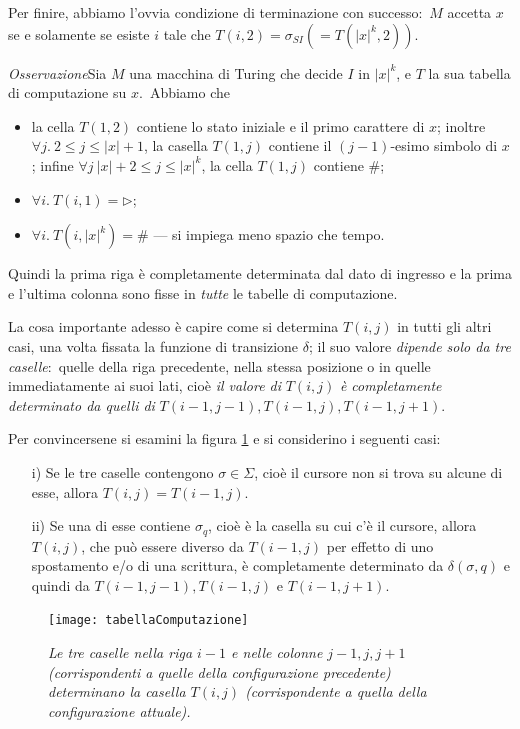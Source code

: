 \noindent Per finire, abbiamo l'ovvia condizione di terminazione con successo:\ $M$ accetta $x$ se e solamente se esiste $i$ tale che $T(i, 2) = \sigma_{SI} (= T(|x|^k, 2))$.\

\medskip
\noindent\textit{Osservazione}\quad Sia $M$ una macchina di Turing che decide $I$ in $|x|^k$, e $T$ la sua tabella di computazione su $x$.\
Abbiamo che

\begin{itemize}
    \item la cella $T(1,2)$ contiene lo stato iniziale e il primo carattere di $x$; inoltre $\forall j.\ 2 \leq j \leq |x|+1$, la casella $T(1,j)$ contiene il $(j-1)$-esimo simbolo di $x$; infine $\forall j\ |x| + 2 \leq j \leq |x|^k$, la cella $T(1,j)$ contiene \#;
    \item $\forall i.\ T(i,1) = \triangleright$;
    \item $\forall i.\ T\left(i,|x|^k\right) = \#$ --- si impiega meno spazio che tempo.
\end{itemize}

\noindent Quindi la prima riga è completamente determinata dal dato di ingresso e la prima e l'ultima colonna sono fisse in \textit{tutte} le tabelle di computazione.\

La cosa importante adesso è capire come si determina $T(i,j)$ in tutti gli altri casi, una volta fissata la funzione di transizione $\delta$; il suo valore \textit{dipende solo da tre caselle}:\ quelle della riga precedente, nella stessa posizione o in quelle immediatamente ai suoi lati, cioè \textit{il valore di} $T(i,j)$ \textit{è completamente determinato da quelli di} $T(i-1,j-1), T(i-1,j), T(i-1, j+1)$.\

\medskip
\noindent Per convincersene si esamini la figura \ref{fig:tabella} e si considerino i seguenti casi:

\begin{itemize}
    \item[i)] Se le tre caselle contengono $\sigma \in \Sigma$, cioè il cursore non si trova su alcune di esse, allora $T(i,j)= T(i-1,j)$.
    \item[ii)] Se una di esse contiene $\sigma_q$, cioè è la casella su cui c'è il cursore, allora $T(i,j)$, che può essere diverso da $T(i-1,j)$ per effetto di uno spostamento e/o di una scrittura, è completamente determinato da $\delta(\sigma, q)$ e quindi da $T(i-1,j-1), T(i-1,j)$ e $T(i-1,j+1)$.\
\end{itemize}

\begin{figure}[H]
    \centering
    \texttt{[image: tabellaComputazione]}
    \caption{\textit{Le tre caselle nella riga $i - 1$ e nelle colonne $j - 1, j, j + 1$ (corrispondenti a quelle della configurazione precedente) determinano la casella $T(i, j)$ (corrispondente a quella della configurazione attuale).}}
    \label{fig:tabella}
\end{figure}

